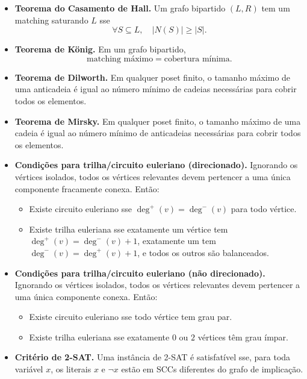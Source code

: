 \begin{itemize}[leftmargin=*,label={}]
  \item \textbf{Teorema do Casamento de Hall.}
  Um grafo bipartido $(L,R)$ tem um matching saturando $L$ sse
  \[
    \forall S \subseteq L,\quad |N(S)| \ge |S|.
  \]

  \item \textbf{Teorema de K\"onig.}
  Em um grafo bipartido,
  \[
    \text{matching m\'aximo} = \text{cobertura m\'inima}.
  \]

  \item \textbf{Teorema de Dilworth.}
  Em qualquer poset finito, o tamanho m\'aximo de uma anticadeia \'e igual ao n\'umero m\'inimo de cadeias necess\'arias para cobrir todos os elementos.

  \item \textbf{Teorema de Mirsky.}
  Em qualquer poset finito, o tamanho m\'aximo de uma cadeia \'e igual ao n\'umero m\'inimo de anticadeias necess\'arias para cobrir todos os elementos.

  \item \textbf{Condi\c{c}\~oes para trilha/circuito euleriano (direcionado).}
  Ignorando os v\'ertices isolados, todos os v\'ertices relevantes devem pertencer a uma \'unica componente fracamente conexa.
  Ent\~ao:
  \begin{itemize}
    \item Existe circuito euleriano sse $\deg^+(v)=\deg^-(v)$ para todo v\'ertice.
    \item Existe trilha euleriana sse exatamente um v\'ertice tem $\deg^+(v)=\deg^-(v)+1$, exatamente um tem $\deg^-(v)=\deg^+(v)+1$, e todos os outros s\~ao balanceados.
  \end{itemize}

  \item \textbf{Condi\c{c}\~oes para trilha/circuito euleriano (n\~ao direcionado).}
  Ignorando os v\'ertices isolados, todos os v\'ertices relevantes devem pertencer a uma \'unica componente conexa.
  Ent\~ao:
  \begin{itemize}
    \item Existe circuito euleriano sse todo v\'ertice tem grau par.
    \item Existe trilha euleriana sse exatamente $0$ ou $2$ v\'ertices t\^em grau \'impar.
  \end{itemize}

  \item \textbf{Crit\'erio de 2-SAT.}
  Uma inst\^ancia de 2-SAT \'e satisfat\'ivel sse, para toda vari\'avel $x$, os literais $x$ e $\neg x$ est\~ao em SCCs diferentes do grafo de implica\c{c}\~ao.


\end{itemize}
